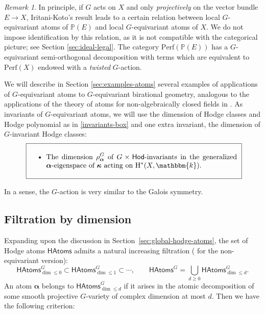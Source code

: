 \documentclass[12pt,a4paper]{amsart}
\theoremstyle{definition}
\theoremstyle{remark}
\newtheorem{remark}[theorem]{Remark}
\begin{document}
\begin{remark}
In principle, if $G$ acts on $X$ and only \textit{projectively} on the vector bundle $E\to X$, Iritani-Koto's result leads to a certain relation between local $G$-equivariant atoms of $\mathbb P(E)$ and local $G$-equivariant atoms of $X$. We do not impose identification by this relation, as it is not compatible with the categorical picture; see Section \ref{sec:ideal-legal}. The category $\mathrm{Perf}(\mathbb P(E))$ has a $G$-equivariant semi-orthogonal decomposition with terms which are equivalent to $\mathrm{Perf}(X)$ endowed with a \textit{twisted} $G$-action.
\end{remark}

We will describe in Section \ref{sec:examples-atoms} several examples of applications of $G$-equivariant atoms to $G$-equivariant birational geometry, analogous to the applications of the theory of atoms for non-algebraically closed fields in \cite{katzarkovpantevyu}. As invariants of $G$-equivariant atoms, we will use the dimension of Hodge classes and Hodge polynomial as in \eqref{invariants-box} and one extra invariant, the dimension of $G$-invariant Hodge classes:
\begin{equation}
\text{
\fbox{\parbox{0.85\textwidth}{
\begin{itemize}
    \item The dimension \(\rho_{\boldsymbol\alpha}^G\) of $G\times \mathsf{Hod}$-invariants in the generalized \(\boldsymbol\alpha\)-eigenspace of \(\boldsymbol{\kappa}\) acting on $\mathrm{H}^{*}(X,\mathbbm{k})$.
\end{itemize}
}
}}\label{invariants3-box}
\end{equation}

In a sense, the $G$-action is very similar to the Galois symmetry.

\subsection{Filtration by dimension}
\label{sec:filtration}
Expanding upon the discussion in Section~\ref{sec:global-hodge-atoms}, the set of Hodge atoms $\mathsf{HAtoms}$ admits a natural increasing filtration (\cite[Section 5.2.6]{katzarkovpantevyu} for the non-equivariant version):
\[
\mathsf{HAtoms}_{\dim \leq 0}^G
\subset
\mathsf{HAtoms}_{\dim \leq 1}^G
\subset \cdots, 
\qquad
\mathsf{HAtoms}^G =
\bigcup_{d \geq 0} \mathsf{HAtoms}_{\dim \leq d}^G.
\]
An atom $\boldsymbol\alpha$ belongs to $\mathsf{HAtoms}_{\dim \leq d}^G$ if it arises in the atomic decomposition of some smooth projective $G$-variety of complex dimension at most $d$. Then we have the following criterion:
\end{document}
